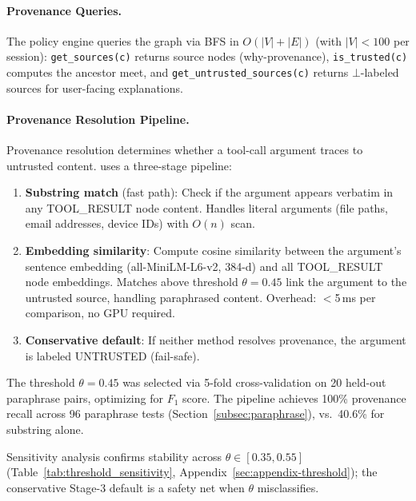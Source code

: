 \paragraph{Provenance Queries.}
The policy engine queries the graph via BFS in $O(|V|+|E|)$ (with $|V|<100$ per session): \texttt{get\_sources(c)} returns source nodes (why-provenance), \texttt{is\_trusted(c)} computes the ancestor meet, and \texttt{get\_untrusted\_sources(c)} returns $\bot$-labeled sources for user-facing explanations.

\paragraph{Provenance Resolution Pipeline.}
Provenance resolution determines whether a tool-call argument traces to untrusted content. \sys{} uses a three-stage pipeline:
\begin{enumerate}[leftmargin=1.5em]
  \item \textbf{Substring match} (fast path): Check if the argument appears verbatim in any TOOL\_RESULT node content. Handles literal arguments (file paths, email addresses, device IDs) with $O(n)$ scan.
  \item \textbf{Embedding similarity}: Compute cosine similarity between the argument's sentence embedding (all-MiniLM-L6-v2, 384-d) and all TOOL\_RESULT node embeddings. Matches above threshold $\theta = 0.45$ link the argument to the untrusted source, handling paraphrased content. Overhead: $<$5\,ms per comparison, no GPU required.
  \item \textbf{Conservative default}: If neither method resolves provenance, the argument is labeled UNTRUSTED (fail-safe).
\end{enumerate}
The threshold $\theta = 0.45$ was selected via 5-fold cross-validation on 20 held-out paraphrase pairs, optimizing for $F_1$ score. The pipeline achieves 100\% provenance recall across 96 paraphrase tests (Section~\ref{subsec:paraphrase}), vs.\ 40.6\% for substring alone.

Sensitivity analysis confirms stability across $\theta \in [0.35, 0.55]$ (Table~\ref{tab:threshold_sensitivity}, Appendix~\ref{sec:appendix-threshold}); the conservative Stage-3 default is a safety net when $\theta$ misclassifies.
